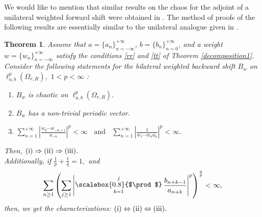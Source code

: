 \documentclass[12pt, reqno]{amsart}
\DeclareMathOperator*{\Mprod}{\text{\raisebox{0.25ex}{\scalebox{0.8}{$\prod$}}}}
\newtheorem{theorem}{Theorem}[section]
\theoremstyle{definition}
\theoremstyle{remark}
\numberwithin{equation}{section}
\begin{document}
We would like to mention that similar results on the chaos for the adjoint of a unilateral weighted forward shift were obtained in \cite{Das-Mundayadan1}. The method of proofs of the following results are essentially similar to the unilateral analogue given in \cite{Das-Mundayadan1}.



    \begin{theorem}\label{chaos1}
          Assume that $a=\{a_n\}_{n=-\infty}^{+\infty}$, $b=\{b_n\}_{n=0}^{+\infty}$, and a weight $w=\{w_n\}_{n=-\infty}^{+\infty}$ satisfy the conditions \eqref{rr} and \eqref{tt} of Theorem \ref{decomposition1}. Consider the following statements for the bilateral weighted backward shift $B_{w}$ on  $\ell^{p}_{a,b}(\Omega_{r,R}),$ $1< p<\infty$ :
          \begin{enumerate}
              \item[(i)] $ B_{w}$ is chaotic on $\ell^{p}_{a,b}(\Omega_{r,R})$.
\item[(ii)] $B_{w}$ has a non-trivial periodic vector.
\item[(iii)]
 $\displaystyle
\sum_{n=1}^{+\infty}\left\lvert  \frac{w_{0}\cdots w_{-n+1}}{a_{-n}}\right\rvert^{p} < \infty ~~~~\text{and}~~~~\sum_{n=1}^{+\infty} \left\lvert\frac{1}{w_{1}\cdots w_{n}a_{n}}\right\rvert^{p}<\infty. 
 $
          \end{enumerate} 
            Then, $\textnormal{(i)} \Rightarrow \textnormal{(ii)}\Rightarrow \textnormal{(iii)}.$ \\ Additionally, if $\frac{1}{p}+\frac{1}{q}=1,$ and 
            \[
            \sum_{n\geq 1}\left(\sum_{j\geq 1}\left\lvert \Mprod_{k=1}^{j}\frac{b_{n+k-1}}{ a_{n+k}}\right\rvert^{p}\right)^{\frac{q}{p}}<\infty,
            \]
            then, we get the characterizations: $\textnormal{(i)} \Leftrightarrow \textnormal{(ii)} \Leftrightarrow \textnormal{(iii)}.$
    \end{theorem}
\end{document}
